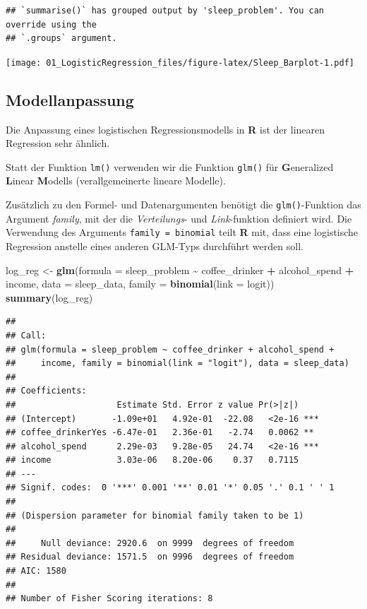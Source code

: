 \documentclass[
]{article}
\newenvironment{Shaded}{\begin{snugshade}}{\end{snugshade}}
\newcommand{\AttributeTok}[1]{\textcolor[rgb]{0.13,0.29,0.53}{#1}}
\newcommand{\FunctionTok}[1]{\textcolor[rgb]{0.13,0.29,0.53}{\textbf{#1}}}
\newcommand{\NormalTok}[1]{#1}
\newcommand{\OtherTok}[1]{\textcolor[rgb]{0.56,0.35,0.01}{#1}}
\newcommand{\SpecialCharTok}[1]{\textcolor[rgb]{0.81,0.36,0.00}{\textbf{#1}}}
\newcommand{\StringTok}[1]{\textcolor[rgb]{0.31,0.60,0.02}{#1}}
\begin{document}
\begin{verbatim}
## `summarise()` has grouped output by 'sleep_problem'. You can override using the
## `.groups` argument.
\end{verbatim}

\texttt{[image: 01\_LogisticRegression\_files/figure-latex/Sleep\_Barplot-1.pdf]}

\subsection{Modellanpassung}\label{modellanpassung}

Die Anpassung eines logistischen Regressionsmodells in \textbf{R} ist der linearen Regression sehr ähnlich.

Statt der Funktion \texttt{lm()} verwenden wir die Funktion \texttt{glm()} für \textbf{G}eneralized \textbf{L}inear \textbf{M}odells (verallgemeinerte lineare Modelle).

Zusätzlich zu den Formel- und Datenargumenten benötigt die \texttt{glm()}-Funktion das Argument \emph{family}, mit der die \emph{Verteilungs}- und \emph{Link}-funktion definiert wird. Die Verwendung des Arguments \texttt{family\ =\ binomial} teilt \textbf{R} mit, dass eine logistische Regression anstelle eines anderen GLM-Typs durchführt werden soll.

\begin{Shaded}
\begin{Highlighting}[]
\NormalTok{  log\_reg }\OtherTok{\textless{}{-}} \FunctionTok{glm}\NormalTok{(}\AttributeTok{formula =}\NormalTok{ sleep\_problem }\SpecialCharTok{\textasciitilde{}}\NormalTok{ coffee\_drinker }\SpecialCharTok{+} 
\NormalTok{                                           alcohol\_spend }\SpecialCharTok{+}
\NormalTok{                                           income,}
                    \AttributeTok{data =}\NormalTok{ sleep\_data,}
                  \AttributeTok{family =} \FunctionTok{binomial}\NormalTok{(}\AttributeTok{link =} \StringTok{\textquotesingle{}logit\textquotesingle{}}\NormalTok{))}
  \FunctionTok{summary}\NormalTok{(log\_reg)}
\end{Highlighting}
\end{Shaded}

\begin{verbatim}
## 
## Call:
## glm(formula = sleep_problem ~ coffee_drinker + alcohol_spend + 
##     income, family = binomial(link = "logit"), data = sleep_data)
## 
## Coefficients:
##                    Estimate Std. Error z value Pr(>|z|)    
## (Intercept)       -1.09e+01   4.92e-01  -22.08   <2e-16 ***
## coffee_drinkerYes -6.47e-01   2.36e-01   -2.74   0.0062 ** 
## alcohol_spend      2.29e-03   9.28e-05   24.74   <2e-16 ***
## income             3.03e-06   8.20e-06    0.37   0.7115    
## ---
## Signif. codes:  0 '***' 0.001 '**' 0.01 '*' 0.05 '.' 0.1 ' ' 1
## 
## (Dispersion parameter for binomial family taken to be 1)
## 
##     Null deviance: 2920.6  on 9999  degrees of freedom
## Residual deviance: 1571.5  on 9996  degrees of freedom
## AIC: 1580
## 
## Number of Fisher Scoring iterations: 8
\end{verbatim}
\end{document}
